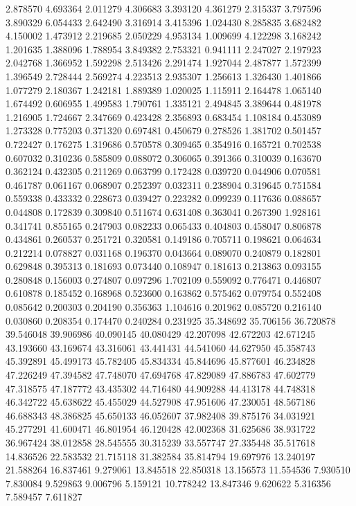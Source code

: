 2.878570
4.693364
2.011279
4.306683
3.393120
4.361279
2.315337
3.797596
3.890329
6.054433
2.642490
3.316914
3.415396
1.024430
8.285835
3.682482
4.150002
1.473912
2.219685
2.050229
4.953134
1.009699
4.122298
3.168242
1.201635
1.388096
1.788954
3.849382
2.753321
0.941111
2.247027
2.197923
2.042768
1.366952
1.592298
2.513426
2.291474
1.927044
2.487877
1.572399
1.396549
2.728444
2.569274
4.223513
2.935307
1.256613
1.326430
1.401866
1.077279
2.180367
1.242181
1.889389
1.020025
1.115911
2.164478
1.065140
1.674492
0.606955
1.499583
1.790761
1.335121
2.494845
3.389644
0.481978
1.216905
1.724667
2.347669
0.423428
2.356893
0.683454
1.108184
0.453089
1.273328
0.775203
0.371320
0.697481
0.450679
0.278526
1.381702
0.501457
0.722427
0.176275
1.319686
0.570578
0.309465
0.354916
0.165721
0.702538
0.607032
0.310236
0.585809
0.088072
0.306065
0.391366
0.310039
0.163670
0.362124
0.432305
0.211269
0.063799
0.172428
0.039720
0.044906
0.070581
0.461787
0.061167
0.068907
0.252397
0.032311
0.238904
0.319645
0.751584
0.559338
0.433332
0.228673
0.039427
0.223282
0.099239
0.117636
0.088657
0.044808
0.172839
0.309840
0.511674
0.631408
0.363041
0.267390
1.928161
0.341741
0.855165
0.247903
0.082233
0.065433
0.404803
0.458047
0.806878
0.434861
0.260537
0.251721
0.320581
0.149186
0.705711
0.198621
0.064634
0.212214
0.078827
0.031168
0.196370
0.043664
0.089070
0.240879
0.182801
0.629848
0.395313
0.181693
0.073440
0.108947
0.181613
0.213863
0.093155
0.280848
0.156003
0.274807
0.097296
1.702109
0.559092
0.776471
0.446807
0.610878
0.185452
0.168968
0.523600
0.163862
0.575462
0.079754
0.552408
0.085642
0.200303
0.204190
0.356363
1.104616
0.201962
0.085720
0.216140
0.030860
0.208354
0.174470
0.240284
0.231925
35.348692
35.706156
36.720878
39.546048
39.906986
40.090145
40.080429
42.207098
42.672203
42.671245
43.193660
43.169674
43.316061
43.441431
44.541060
44.627950
45.358743
45.392891
45.499173
45.782405
45.834334
45.844696
45.877601
46.234828
47.226249
47.394582
47.748070
47.694768
47.829089
47.886783
47.602779
47.318575
47.187772
43.435302
44.716480
44.909288
44.413178
44.748318
46.342722
45.638622
45.455029
44.527908
47.951606
47.230051
48.567186
46.688343
48.386825
45.650133
46.052607
37.982408
39.875176
34.031921
45.277291
41.600471
46.801954
46.120428
42.002368
31.625686
38.931722
36.967424
38.012858
28.545555
30.315239
33.557747
27.335448
35.517618
14.836526
22.583532
21.715118
31.382584
35.814794
19.697976
13.240197
21.588264
16.837461
9.279061
13.845518
22.850318
13.156573
11.554536
7.930510
7.830084
9.529863
9.006796
5.159121
10.778242
13.847346
9.620622
5.316356
7.589457
7.611827

